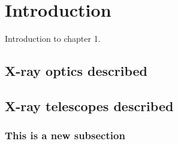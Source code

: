 \chapter{Introduction}
Introduction to chapter 1.

\section{X-ray optics described}
\section{X-ray telescopes described}
\subsection{This is a new subsection}
